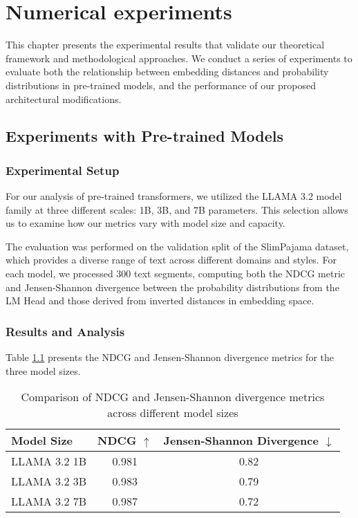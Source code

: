 \chapter{Numerical experiments}

This chapter presents the experimental results that validate our theoretical framework and methodological approaches. We conduct a series of experiments to evaluate both the relationship between embedding distances and probability distributions in pre-trained models, and the performance of our proposed architectural modifications.

\section{Experiments with Pre-trained Models}

\subsection{Experimental Setup}

For our analysis of pre-trained transformers, we utilized the LLAMA 3.2 model family at three different scales: 1B, 3B, and 7B parameters. This selection allows us to examine how our metrics vary with model size and capacity.

The evaluation was performed on the validation split of the SlimPajama dataset, which provides a diverse range of text across different domains and styles. For each model, we processed 300 text segments, computing both the NDCG metric and Jensen-Shannon divergence between the probability distributions from the LM Head and those derived from inverted distances in embedding space.

\subsection{Results and Analysis}

Table \ref{tab:pretrained_metrics} presents the NDCG and Jensen-Shannon divergence metrics for the three model sizes.

\begin{table}[h]
    \centering
    \caption{Comparison of NDCG and Jensen-Shannon divergence metrics across different model sizes}
    \begin{tabular}{lcc}
    \toprule
    Model Size & NDCG $\uparrow$ & Jensen-Shannon Divergence $\downarrow$ \\
    \midrule
    LLAMA 3.2 1B & 0.981 & 0.82 \\
    LLAMA 3.2 3B & 0.983 & 0.79 \\
    LLAMA 3.2 7B & 0.987 & 0.72 \\
    \bottomrule
    \end{tabular}
    \label{tab:pretrained_metrics}
\end{table}

